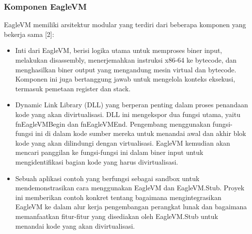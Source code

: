 \subsubsection{Komponen EagleVM}
EagleVM memiliki arsitektur modular yang terdiri dari beberapa komponen yang bekerja sama [2]:
\begin{itemize}
	\item {} Inti dari EagleVM, berisi logika utama untuk memproses biner input, melakukan disassembly, menerjemahkan instruksi x86-64 ke bytecode, dan menghasilkan biner output yang mengandung mesin virtual dan bytecode. Komponen ini juga bertanggung jawab untuk mengelola konteks eksekusi, termasuk pemetaan register dan stack.
	\item {} Dynamic Link Library (DLL) yang berperan penting dalam proses penandaan kode yang akan divirtualisasi. DLL ini mengekspor dua fungsi utama, yaitu fnEagleVMBegin dan fnEagleVMEnd. Pengembang menggunakan fungsi-fungsi ini di dalam kode sumber mereka untuk menandai awal dan akhir blok kode yang akan dilindungi dengan virtualisasi. EagleVM kemudian akan mencari panggilan ke fungsi-fungsi ini dalam biner input untuk mengidentifikasi bagian kode yang harus divirtualisasi.
	\item {} Sebuah aplikasi contoh yang berfungsi sebagai sandbox untuk mendemonstrasikan cara menggunakan EagleVM dan EagleVM.Stub. Proyek ini memberikan contoh konkret tentang bagaimana mengintegrasikan EagleVM ke dalam alur kerja pengembangan perangkat lunak dan bagaimana memanfaatkan fitur-fitur yang disediakan oleh EagleVM.Stub untuk menandai kode yang akan divirtualisasi.
\end{itemize}

